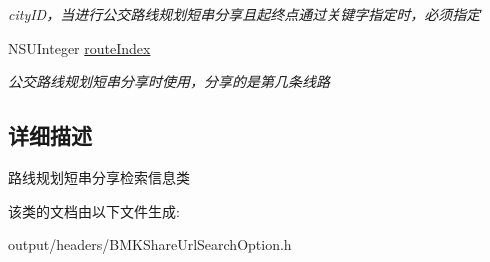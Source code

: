 \begin{DoxyCompactItemize}
\begin{DoxyCompactList}\small\item\em city\+I\+D，当进行公交路线规划短串分享且起终点通过关键字指定时，必须指定 \end{DoxyCompactList}\item 
\hypertarget{interface_b_m_k_route_plan_share_u_r_l_option_a54cafa49f31c9bc30dccd46438ce1aad}{}N\+S\+U\+Integer \hyperlink{interface_b_m_k_route_plan_share_u_r_l_option_a54cafa49f31c9bc30dccd46438ce1aad}{route\+Index}\label{interface_b_m_k_route_plan_share_u_r_l_option_a54cafa49f31c9bc30dccd46438ce1aad}

\begin{DoxyCompactList}\small\item\em 公交路线规划短串分享时使用，分享的是第几条线路 \end{DoxyCompactList}\end{DoxyCompactItemize}


\subsection{详细描述}
路线规划短串分享检索信息类 

该类的文档由以下文件生成\+:\begin{DoxyCompactItemize}
\item 
output/headers/B\+M\+K\+Share\+Url\+Search\+Option.\+h\end{DoxyCompactItemize}
